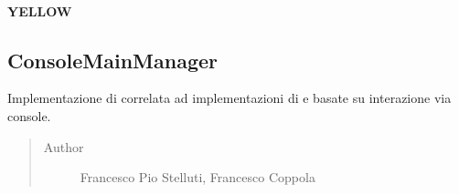 \documentclass[letterpaper,10pt,italian,openany,oneside]{sphinxmanual}
\begin{document}
\paragraph{YELLOW}
\label{\detokenize{test/it/unicam/cs/pa/mastermind/gamecore/ColorPegs:yellow}}

\begin{fulllineitems}
\label{\detokenize{test/it/unicam/cs/pa/mastermind/gamecore/ColorPegs:it.unicam.cs.pa.mastermind.gamecore.ColorPegs.YELLOW}}
\end{fulllineitems}



\subsection{ConsoleMainManager}
\label{\detokenize{test/it/unicam/cs/pa/mastermind/gamecore/ConsoleMainManager:consolemainmanager}}\label{\detokenize{test/it/unicam/cs/pa/mastermind/gamecore/ConsoleMainManager::doc}}

\begin{fulllineitems}
\label{\detokenize{test/it/unicam/cs/pa/mastermind/gamecore/ConsoleMainManager:it.unicam.cs.pa.mastermind.gamecore.ConsoleMainManager}}
Implementazione di  correlata ad implementazioni di  e  basate su interazione via console.
\begin{quote}\begin{description}
\item[{Author}] \leavevmode
Francesco Pio Stelluti, Francesco Coppola

\end{description}\end{quote}

\end{fulllineitems}
\end{document}
